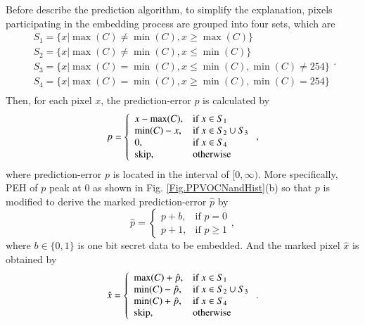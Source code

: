 \documentclass[review,3p,10pt,sort&compress]{elsarticle}
\begin{document}
Before describe the prediction algorithm, to simplify the explanation, pixels participating in the embedding process are grouped into four sets, which are
\begin{equation*}\label{eq:S}
\begin{array}{ll}
S_1 = \{ x | \max(C) \neq \min(C), x \geq \max(C) \} \\
S_2 = \{ x | \max(C) \neq \min(C), x \leq \min(C) \} \\
S_3 = \{ x | \max(C)   =  \min(C), x \leq \min(C), \min(C) \neq 254 \} \\
S_4 = \{ x | \max(C)   =  \min(C), x \geq \min(C), \min(C) =  254 \} \\
\end{array}.
\end{equation*}
Then, for each pixel $x$, the prediction-error $p$ is calculated by
\begin{equation}\label{eq:PPVOPE}
p = \left\{\begin{array}{ll}
x - \max(C),    & \text{if } x \in S_1  \\
\min(C) - x,    & \text{if } x \in S_2 \cup S_3 \\
0,              & \text{if } x \in S_4 \\
{\rm skip},     & \text{otherwise}
\end{array}\right.,
\end{equation}
where prediction-error $p$ is located in the interval of $[0, \infty)$. More specifically, PEH of $p$ peak at 0 as shown in Fig. \ref{Fig.PPVOCNandHist}(b) so that $p$ is modified to derive the marked prediction-error $\hat{p}$ by
\begin{equation}\label{eq:PPVOMPE}
\hat{p} = \left\{\begin{array}{ll}
p + b,  & \text{if } p = 0      \\
p + 1,  & \text{if } p \geq 1
\end{array}\right.,
\end{equation}
where $b \in \{0,1\}$ is one bit secret data to be embedded. And the marked pixel $\hat{x}$ is obtained by
\begin{equation}\label{eq:PPVOMPixel}
\hat{x} = \left\{\begin{array}{ll}
\max(C) + \hat{p},  & \text{if } x \in S_1 \\
\min(C) - \hat{p},  & \text{if } x \in S_2 \cup S_3 \\
\min(C) + \hat{p},  & \text{if } x \in S_4 \\
{\rm skip},         & \text{otherwise}
\end{array}\right..
\end{equation}
\end{document}
